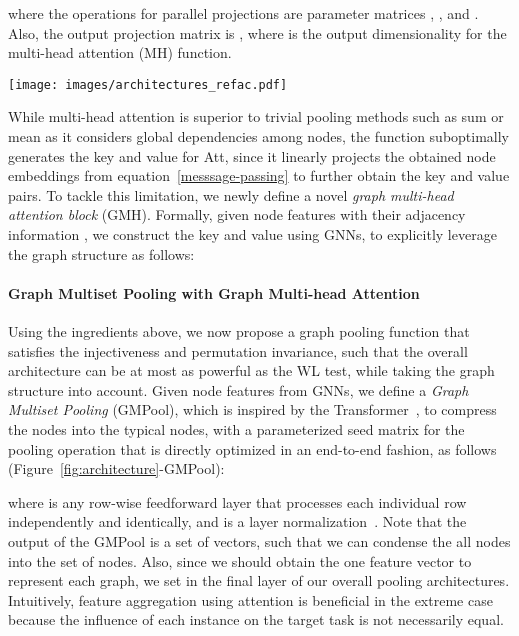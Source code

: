 \documentclass{article} \usepackage{iclr2021_conference,times}
\begin{document}
where the operations for  parallel projections are parameter matrices , , and . Also, the output projection matrix is , where  is the output dimensionality for the multi-head attention (MH) function. 

\begin{figure*}[t]
    \centering
    \texttt{[image: images/architectures\_refac.pdf]}
    \vskip -0.125in
    \caption{\small \textbf{Graph Multiset Transformer.}
    Given a graph passed through several message passing layers, we use an attention-based pooling block (GMPool) and a self-attention block (SelfAtt) to compress the nodes into few important nodes and consider the interaction among them respectively, within a multiset framework.}
    \vskip -0.125in
    \label{fig:architecture}
\end{figure*}

While multi-head attention is superior to trivial pooling methods such as sum or mean as it considers global dependencies among nodes, the  function suboptimally generates the key  and value  for Att, since it linearly projects the obtained node embeddings  from equation~\ref{messsage-passing} to further obtain the key and value pairs. To tackle this limitation, we newly define a novel \emph{graph multi-head attention block} (GMH). Formally, given node features  with their adjacency information , we construct the key and value using GNNs, to explicitly leverage the graph structure as follows:


\paragraph{Graph Multiset Pooling with Graph Multi-head Attention}
Using the ingredients above, we now propose a graph pooling function that satisfies the injectiveness and permutation invariance, such that the overall architecture can be at most as powerful as the WL test, while taking the graph structure into account. Given node features  from GNNs, we define a \emph{Graph Multiset Pooling} (GMPool), which is inspired by the Transformer~\citep{Transformer, SetTransformer}, to compress the  nodes into the  typical nodes, with a parameterized seed matrix  for the pooling operation that is directly optimized in an end-to-end fashion, as follows (Figure~\ref{fig:architecture}-GMPool):

where  is any row-wise feedforward layer that processes each individual row independently and identically, and  is a layer normalization~\citep{LayerNormalization}. Note that the output of the GMPool is a set of  vectors, such that we can condense the all nodes into the set of  nodes. Also, since we should obtain the one feature vector to represent each graph, we set  in the final layer of our overall pooling architectures. Intuitively, feature aggregation using attention is beneficial in the extreme case  because the influence of each instance on the target task is not necessarily equal. 
\end{document}
